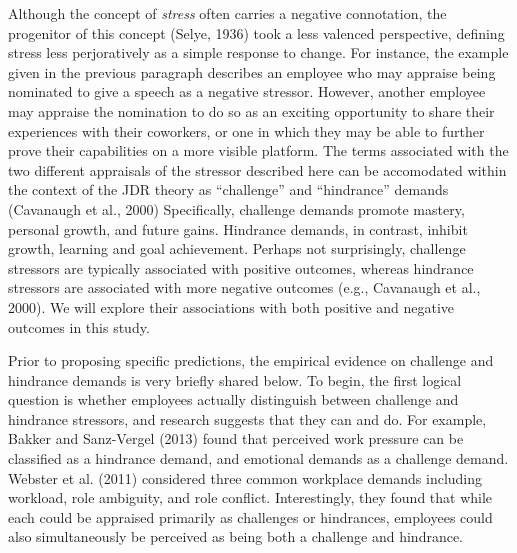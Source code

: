 \documentclass[
  man]{apa6}
\begin{document}
Although the concept of \emph{stress} often carries a negative connotation, the progenitor of this concept (Selye, 1936) took a less valenced perspective, defining stress less perjoratively as a simple response to change. For instance, the example given in the previous paragraph describes an employee who may appraise being nominated to give a speech as a negative stressor. However, another employee may appraise the nomination to do so as an exciting opportunity to share their experiences with their coworkers, or one in which they may be able to further prove their capabilities on a more visible platform. The terms associated with the two different appraisals of the stressor described here can be accomodated within the context of the JDR theory as ``challenge'' and ``hindrance'' demands (Cavanaugh et al., 2000) Specifically, challenge demands promote mastery, personal growth, and future gains. Hindrance demands, in contrast, inhibit growth, learning and goal achievement. Perhaps not surprisingly, challenge stressors are typically associated with positive outcomes, whereas hindrance stressors are associated with more negative outcomes (e.g., Cavanaugh et al., 2000). We will explore their associations with both positive and negative outcomes in this study.

Prior to proposing specific predictions, the empirical evidence on challenge and hindrance demands is very briefly shared below. To begin, the first logical question is whether employees actually distinguish between challenge and hindrance stressors, and research suggests that they can and do. For example, Bakker and Sanz-Vergel (2013) found that perceived work pressure can be classified as a hindrance demand, and emotional demands as a challenge demand. Webster et al. (2011) considered three common workplace demands including workload, role ambiguity, and role conflict. Interestingly, they found that while each could be appraised primarily as challenges or hindrances, employees could also simultaneously be perceived as being both a challenge and hindrance.
\end{document}
